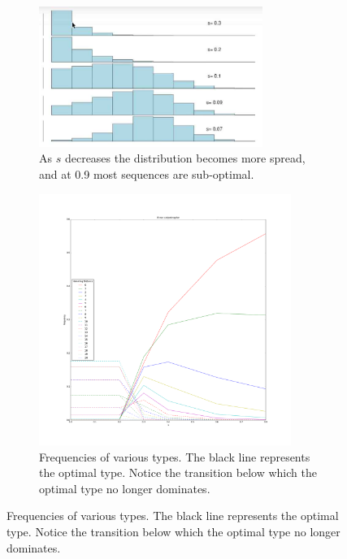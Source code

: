 \documentclass[]{article}
\begin{document}
\begin{figure}[H]
	\caption{The effect of varying $s$ on the quasispecies}
	\begin{subfigure}[t]{0.45\textwidth}
		\caption{As $s$ decreases the distribution becomes more spread, and at 0.9 most sequences are sub-optimal.}\label{fig:QuasispeciesForDifferentS}
		\includegraphics[width=0.8\textwidth]{QuasispeciesForDifferentS}
	\end{subfigure}
	\begin{subfigure}[t]{0.45\textwidth}
		\caption{Frequencies of various types. The black line represents the optimal type. Notice the transition below which the optimal type no longer dominates. }\label{fig:ErrorCatastrophe2} 
		\includegraphics[width=0.9\textwidth]{ErrorCatastrophe2}
	\end{subfigure}
\end{figure}
\end{document}
